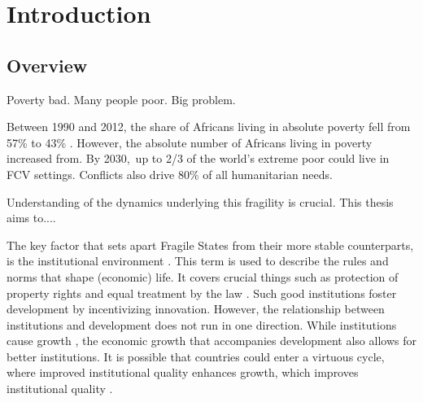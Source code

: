 \chapter{Introduction}
\section{Overview}





Poverty bad. Many people poor. Big problem.

Between 1990 and 2012, the share of Africans living in absolute poverty fell from 57\% to 43\% \cite{WorldBank2016}. However, the absolute number of Africans living in poverty increased from. By 2030,  up to 2/3 of the world's extreme poor could live in FCV settings. Conflicts also drive 80\% of all humanitarian needs.


Understanding of the dynamics underlying this fragility is crucial. This thesis aims to....

The key factor that sets apart Fragile States from their more stable counterparts, is the institutional environment \citep{Rodrik2004,Acemoglu2000}. This term is used to describe the rules and norms that shape (economic) life. It covers crucial things such as protection of property rights and equal treatment by the law \citep{Acemoglu2005}. Such good institutions  foster development by incentivizing innovation. However, the relationship between institutions and development does not run in one direction. While institutions cause growth \citep{Acemoglu2000}, the economic growth that accompanies development also allows for better institutions. It is possible that countries could enter a virtuous cycle, where improved institutional quality enhances growth, which improves institutional quality \citep{Voors2011}.

